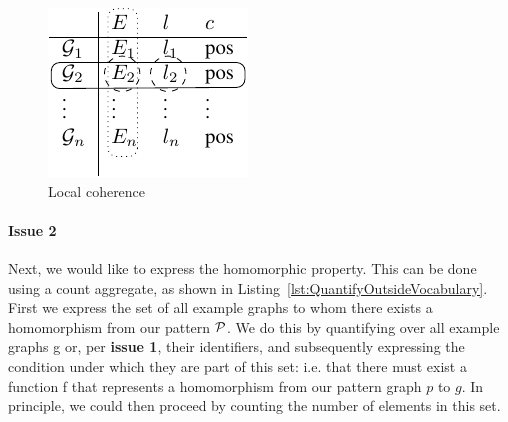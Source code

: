 \begin{figure}[h]
\centering
\includegraphics{CoherenceTable-crop.pdf}
\caption{Local coherence\label{fig:LocalCoherence}}
\end{figure}


\paragraph{Issue 2}
Next, we would like to express the homomorphic property.
This can be done using a count aggregate, as shown in Listing~\ref{lst:QuantifyOutsideVocabulary}.
First we express the set of all example graphs to whom there exists a homomorphism from our pattern $\mathcal{P}$.
We do this by quantifying over all example graphs g or, per \textbf{issue 1}, their identifiers, and subsequently 
expressing the condition under which they are part of this set: i.e. that there must exist a function f that represents a homomorphism from our pattern graph $p$ to $g$.
In principle, we could then proceed by counting the number of elements in this set.

